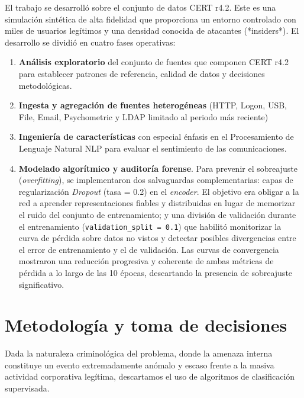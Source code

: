 \documentclass[IB]{TFUOC}%
\begin{document}
\medskip
\noindent El trabajo se desarrolló sobre el conjunto de datos CERT r4.2. Este es una simulación sintética de alta fidelidad que proporciona un entorno controlado con miles de usuarios legítimos y una densidad conocida de atacantes (*insiders*). El desarrollo se dividió en cuatro fases operativas: 
    \begin{enumerate}
        \item \textbf{Análisis exploratorio} del conjunto de fuentes que componen CERT r4.2 para establecer patrones de referencia, calidad de datos y decisiones metodológicas.
        \item \textbf{Ingesta y agregación de fuentes heterogéneas} (HTTP, Logon, USB, File, Email, Psychometric y LDAP limitado al periodo más reciente)
        \item \textbf{Ingeniería de características} con especial énfasis en el Procesamiento de Lenguaje Natural NLP para evaluar el sentimiento de las comunicaciones.
        \item \textbf{Modelado algorítmico y auditoría forense}. Para prevenir el sobreajuste (\textit{overfitting}), se implementaron dos salvaguardas complementarias: capas de regularización \textit{Dropout} (tasa = 0.2) en el \textit{encoder}. El objetivo era obligar a la red a aprender representaciones fiables y distribuidas en lugar de memorizar el ruido del conjunto de entrenamiento; y una división de validación durante el entrenamiento (\texttt{validation\_split = 0.1}) que habilitó monitorizar la curva de pérdida sobre datos no vistos y detectar posibles divergencias entre el error de entrenamiento y el de validación. Las curvas de convergencia mostraron una reducción progresiva y coherente de ambas métricas de pérdida a lo largo de las 10 épocas, descartando la presencia de sobreajuste significativo.
    \end{enumerate}
    
\section{Metodología y toma de decisiones}

Dada la naturaleza criminológica del problema, donde la amenaza interna constituye un evento extremadamente anómalo y escaso frente a la masiva actividad corporativa legítima, descartamos el uso de algoritmos de clasificación supervisada. 
\end{document}
